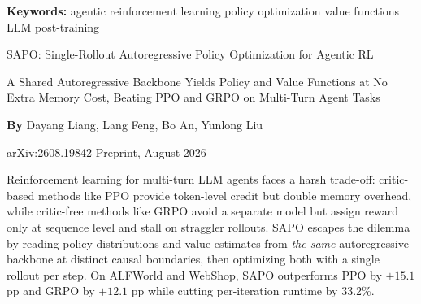 \documentclass[10pt,twocolumn]{article}
\begin{document}
\setlength{\parindent}{0pt}
\setlength{\parskip}{4pt}

{\small\color{keywordgray}\textbf{Keywords:}
  agentic reinforcement learning \textbullet{}
  policy optimization \textbullet{}
  value functions \textbullet{}
  LLM post-training}\par\vspace{4pt}

{\LARGE\bfseries\raggedright
  SAPO: Single-Rollout Autoregressive
  Policy Optimization for Agentic RL}\par\vspace{4pt}

{\large\itshape\raggedright
  A Shared Autoregressive Backbone Yields Policy and Value
  Functions at No Extra Memory Cost, Beating PPO and GRPO
  on Multi-Turn Agent Tasks}\par\vspace{6pt}

{\small\textbf{By} Dayang Liang, Lang Feng, Bo An,
  Yunlong Liu}\par\vspace{2pt}

{\small\color{keywordgray}arXiv:2608.19842 \textbullet{} Preprint, August 2026}
\par\vspace{2pt}\noindent{\color{rulered}\rule{\columnwidth}{0.6pt}}\vspace{6pt}

Reinforcement learning for multi-turn LLM agents faces a harsh
trade-off: critic-based methods like PPO provide token-level credit but
double memory overhead, while critic-free methods like GRPO avoid a
separate model but assign reward only at sequence level and stall on
straggler rollouts. SAPO escapes the dilemma by reading policy
distributions and value estimates from \emph{the same} autoregressive
backbone at distinct causal boundaries, then optimizing both with a
single rollout per step. On ALFWorld and WebShop, SAPO outperforms PPO
by $+15.1$ pp and GRPO by $+12.1$ pp while cutting per-iteration
runtime by 33.2\%.
\end{document}
